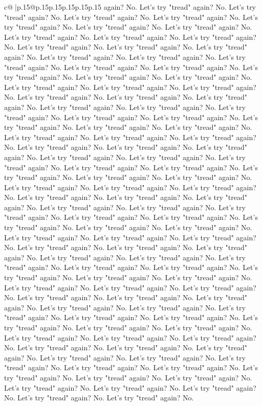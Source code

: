 \documentclass{article}
\begin{document}
{\begin{supertabular}{c@{$\;$}|p{.15\linewidth}@{}p{.15\linewidth}p{.15\linewidth}p{.15\linewidth}p{.15\linewidth}p{.15\linewidth}}
{{{again? No. Let's try "tread" again? No. Let's try "tread" again? No. Let's try "tread" again? No. Let's try "tread" again? No. Let's try "tread" again? No. Let's try "tread" again? No. Let's try "tread" again? No. Let's try "tread" again? No. Let's try "tread" again? No. Let's try "tread" again? No. Let's try "tread" again? No. Let's try "tread" again? No. Let's try "tread" again? No. Let's try "tread" again? No. Let's try "tread" again? No. Let's try "tread" again? No. Let's try "tread" again? No. Let's try "tread" again? No. Let's try "tread" again? No. Let's try "tread" again? No. Let's try "tread" again? No. Let's try "tread" again? No. Let's try "tread" again? No. Let's try "tread" again? No. Let's try "tread" again? No. Let's try "tread" again? No. Let's try "tread" again? No. Let's try "tread" again? No. Let's try "tread" again? No. Let's try "tread" again? No. Let's try "tread" again? No. Let's try "tread" again? No. Let's try "tread" again? No. Let's try "tread" again? No. Let's try "tread" again? No. Let's try "tread" again? No. Let's try "tread" again? No. Let's try "tread" again? No. Let's try "tread" again? No. Let's try "tread" again? No. Let's try "tread" again? No. Let's try "tread" again? No. Let's try "tread" again? No. Let's try "tread" again? No. Let's try "tread" again? No. Let's try "tread" again? No. Let's try "tread" again? No. Let's try "tread" again? No. Let's try "tread" again? No. Let's try "tread" again? No. Let's try "tread" again? No. Let's try "tread" again? No. Let's try "tread" again? No. Let's try "tread" again? No. Let's try "tread" again? No. Let's try "tread" again? No. Let's try "tread" again? No. Let's try "tread" again? No. Let's try "tread" again? No. Let's try "tread" again? No. Let's try "tread" again? No. Let's try "tread" again? No. Let's try "tread" again? No. Let's try "tread" again? No. Let's try "tread" again? No. Let's try "tread" again? No. Let's try "tread" again? No. Let's try "tread" again? No. Let's try "tread" again? No. Let's try "tread" again? No. Let's try "tread" again? No. Let's try "tread" again? No. Let's try "tread" again? No. Let's try "tread" again? No. Let's try "tread" again? No. Let's try "tread" again? No. Let's try "tread" again? No. Let's try "tread" again? No. Let's try "tread" again? No. Let's try "tread" again? No. Let's try "tread" again? No. Let's try "tread" again? No. Let's try "tread" again? No. Let's try "tread" again? No. Let's try "tread" again? No. Let's try "tread" again? No. Let's try "tread" again? No. Let's try "tread" again? No. Let's try "tread" again? No. Let's try "tread" again? No. Let's try "tread" again? No. Let's try "tread" again? No. Let's try "tread" again? No. Let's try "tread" again? No. Let's try "tread" again? No. Let's try "tread" again? No. Let's try "tread" again? No. Let's try "tread" again? No. Let's try "tread" again? No. Let's try "tread" again? No. Let's try "tread" again? No. Let's try "tread" again? No. Let's try "tread" again? No. Let's try "tread" again? No. Let's try "tread" again? No. Let's try "tread" again? No. Let's try "tread" again? No. Let's try "tread" again? No. Let's try "tread" again? No. Let's try "tread" again? No. }}}
\end{supertabular}}
\end{document}
